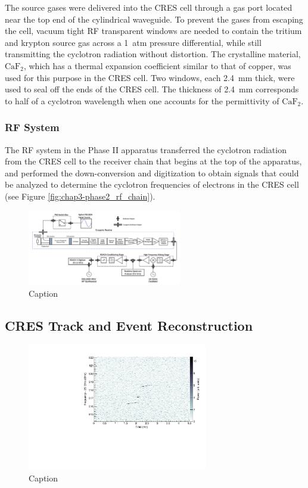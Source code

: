 The source gases were delivered into the CRES cell through a gas port located near the top end of the cylindrical waveguide. To prevent the gases from escaping the cell, vacuum tight RF transparent windows are needed to contain the tritium and krypton source gas across a 1~atm pressure differential, while still transmitting the cyclotron radiation without distortion. The crystalline material, $\mathrm{CaF}_2$, which has a thermal expansion coefficient similar to that of copper, was used for this purpose in the CRES cell. Two windows, each 2.4~mm thick, were used to seal off the ends of the CRES cell. The thickness of 2.4~mm corresponds to half of a cyclotron wavelength when one accounts for the permittivity of $\mathrm{CaF}_2$.

\subsubsection*{RF System}

The RF system in the Phase II apparatus transferred the cyclotron radiation from the CRES cell to the receiver chain that begins at the top of the apparatus, and performed the down-conversion and digitization to obtain signals that could be analyzed to determine the cyclotron frequencies of electrons in the CRES cell (see Figure \ref{fig:chap3-phase2_rf_chain}).
\begin{figure}[htbp]
    \centering
    \includegraphics*[width=0.6\textwidth]{figs/Chapter-3/230620_phase2_rf_chain.png}
    \caption{\label{fig:chap3-phase2-rf-chain} Caption}
\end{figure}

\subsection{CRES Track and Event Reconstruction}

\begin{figure}[htbp]
    \centering
    \includegraphics[width=0.7\textwidth]{figs/Chapter-3/T2_Event0.pdf}
    \caption{Caption}
    \label{fig:tritium_event0}
\end{figure}

